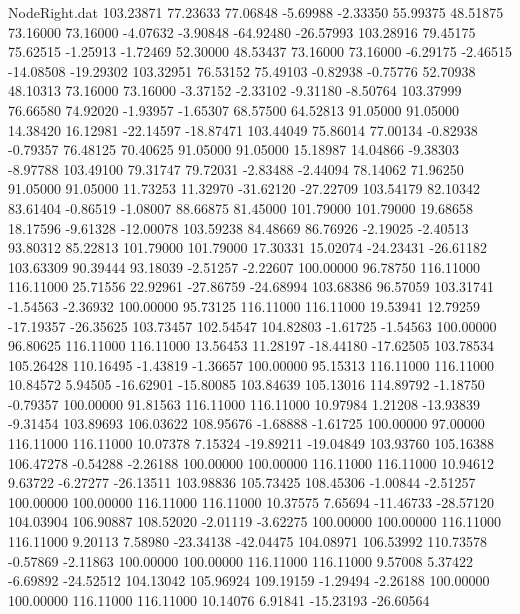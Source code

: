 \begin{filecontents}{NodeRight.dat}
 103.23871   77.23633   77.06848    -5.69988   -2.33350   55.99375   48.51875   73.16000   73.16000   -4.07632   -3.90848  -64.92480  -26.57993
 103.28916   79.45175   75.62515    -1.25913   -1.72469   52.30000   48.53437   73.16000   73.16000   -6.29175   -2.46515  -14.08508  -19.29302
 103.32951   76.53152   75.49103    -0.82938   -0.75776   52.70938   48.10313   73.16000   73.16000   -3.37152   -2.33102   -9.31180   -8.50764
 103.37999   76.66580   74.92020    -1.93957   -1.65307   68.57500   64.52813   91.05000   91.05000   14.38420   16.12981  -22.14597  -18.87471
 103.44049   75.86014   77.00134    -0.82938   -0.79357   76.48125   70.40625   91.05000   91.05000   15.18987   14.04866   -9.38303   -8.97788
 103.49100   79.31747   79.72031    -2.83488   -2.44094   78.14062   71.96250   91.05000   91.05000   11.73253   11.32970  -31.62120  -27.22709
 103.54179   82.10342   83.61404    -0.86519   -1.08007   88.66875   81.45000  101.79000  101.79000   19.68658   18.17596   -9.61328  -12.00078
 103.59238   84.48669   86.76926    -2.19025   -2.40513   93.80312   85.22813  101.79000  101.79000   17.30331   15.02074  -24.23431  -26.61182
 103.63309   90.39444   93.18039    -2.51257   -2.22607  100.00000   96.78750  116.11000  116.11000   25.71556   22.92961  -27.86759  -24.68994
 103.68386   96.57059  103.31741    -1.54563   -2.36932  100.00000   95.73125  116.11000  116.11000   19.53941   12.79259  -17.19357  -26.35625
 103.73457  102.54547  104.82803    -1.61725   -1.54563  100.00000   96.80625  116.11000  116.11000   13.56453   11.28197  -18.44180  -17.62505
 103.78534  105.26428  110.16495    -1.43819   -1.36657  100.00000   95.15313  116.11000  116.11000   10.84572    5.94505  -16.62901  -15.80085
 103.84639  105.13016  114.89792    -1.18750   -0.79357  100.00000   91.81563  116.11000  116.11000   10.97984    1.21208  -13.93839   -9.31454
 103.89693  106.03622  108.95676    -1.68888   -1.61725  100.00000   97.00000  116.11000  116.11000   10.07378    7.15324  -19.89211  -19.04849
 103.93760  105.16388  106.47278    -0.54288   -2.26188  100.00000  100.00000  116.11000  116.11000   10.94612    9.63722   -6.27277  -26.13511
 103.98836  105.73425  108.45306    -1.00844   -2.51257  100.00000  100.00000  116.11000  116.11000   10.37575    7.65694  -11.46733  -28.57120
 104.03904  106.90887  108.52020    -2.01119   -3.62275  100.00000  100.00000  116.11000  116.11000    9.20113    7.58980  -23.34138  -42.04475
 104.08971  106.53992  110.73578    -0.57869   -2.11863  100.00000  100.00000  116.11000  116.11000    9.57008    5.37422   -6.69892  -24.52512
 104.13042  105.96924  109.19159    -1.29494   -2.26188  100.00000  100.00000  116.11000  116.11000   10.14076    6.91841  -15.23193  -26.60564

\end{filecontents}
